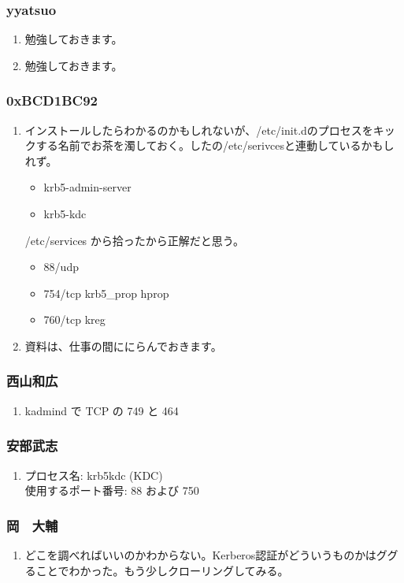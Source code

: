 \documentclass[cjk,dvipdfmx,10pt,%
hyperref={bookmarks=true,bookmarksnumbered=true,bookmarksopen=false,%
colorlinks=false,%
pdftitle={第 63 回 関西 Debian 勉強会},%
pdfauthor={倉敷・のがた・かわだ・佐々木},%
pdfsubject={資料},%
}]{beamer}
\begin{document}
\begin{frame}
  \frametitle{ yyatsuo }
  \begin{enumerate}
  \item 勉強しておきます。
  \item 勉強しておきます。
  \end{enumerate}
\end{frame}

\begin{frame}
  \frametitle{ 0xBCD1BC92 }
  \begin{enumerate}
  \item インストールしたらわかるのかもしれないが、/etc/init.dのプロセスをキックする名前でお茶を濁しておく。したの/etc/serivcesと連動しているかもしれず。
    \begin{itemize}
    \item krb5-admin-server
    \item krb5-kdc 
    \end{itemize}
    /etc/services から拾ったから正解だと思う。
    \begin{itemize}
    \item 88/udp
    \item 754/tcp         krb5\_prop hprop
    \item 760/tcp         kreg
    \end{itemize}
  \item 資料は、仕事の間ににらんでおきます。
  \end{enumerate}
\end{frame}

\begin{frame}
  \frametitle{ 西山和広 }
  \begin{enumerate}
  \item kadmind で TCP の 749 と 464
  \end{enumerate}
\end{frame}

\begin{frame}
  \frametitle{ 安部武志 }
  \begin{enumerate}
  \item プロセス名: krb5kdc (KDC)\\
    使用するポート番号: 88 および 750
  \end{enumerate}
\end{frame}

\begin{frame}
  \frametitle{ 岡　大輔 }
  \begin{enumerate}
  \item どこを調べればいいのかわからない。Kerberos認証がどういうものかはググることでわかった。もう少しクローリングしてみる。
  \end{enumerate}
\end{frame}
\end{document}
